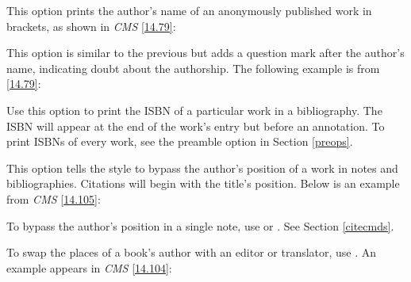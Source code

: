 \documentclass[11pt,letterpaper,oneside]{article}
\begin{document}
\begin{optionlist}


\noindent This option prints the author's name of an anonymously
published work in brackets, as shown in \textit{CMS} \ref{14.79}:

\begin{citebib}
\item \cite{horsley1796}
\end{citebib}


\noindent This option is similar to the previous but adds a question
mark after the author's name, indicating doubt about the authorship.
The following example is from \ref{14.79}:

\begin{citebib}
\item \cite{hawkes1834}
\end{citebib}


\noindent Use this option to print the ISBN of a particular work in a
bibliography. The ISBN will appear at the end of the work's entry but
before an annotation. To print ISBNs of every work, see the
 preamble option in Section \ref{preops}.


\noindent This option tells the style to bypass the author's position
of a work in notes and bibliographies. Citations will begin with the
title's position. Below is an example from \textit{CMS} \ref{14.105}:

\begin{citebib}
\item \cite{chaucer1966}
\end{citebib}

\noindent To bypass the author's position in a single note, use
 or . See Section \ref{citecmds}.


To swap the places of a book's author with an editor or translator,
use . An example appears in \textit{CMS} \ref{14.104}:

\begin{citebib}
\item \cite{pound1953}
\end{citebib}


\end{optionlist}
\end{document}
